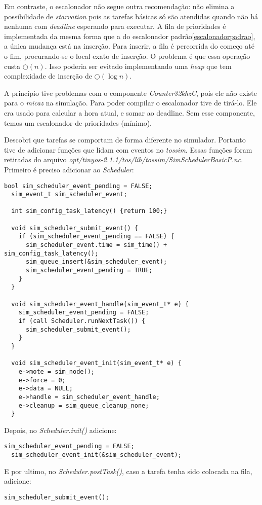 \documentclass[a4paper,onecolumn, 10pt]{article}
\begin{document}
Em contraste, o escalonador não segue outra recomendação: não elimina a possibilidade de \textit{starvation} pois as tarefas
básicas só são atendidas quando não há nenhuma com \textit{deadline} esperando para executar. A fila de prioridades é
implementada da mesma forma que a do escalonador padrão\ref{escalonadorpadrao}, a única mudança está na inserção. Para
inserir, a fila é percorrida do começo até o fim, procurando-se o local exato de inserção. O problema é que essa
operação custa $\bigcirc(n)$. Isso poderia ser evitado implementando uma \textit{heap} que tem complexidade de inserção
de $\bigcirc(\log n)$.

A princípio tive problemas com o componente \textit{Counter32khzC}, 
pois ele não existe para o \textit{micaz} na simulação. Para poder compilar o
escalonador tive de tirá-lo. Ele era usado para calcular a hora atual, e somar ao deadline. Sem esse componente, temos
um escalonador de prioridades (mínimo). 

Descobri que tarefas se comportam de forma diferente no simulador. Portanto tive de adicionar funções que lidam com
eventos no \textit{tossim}. Essas funções foram retiradas do arquivo
\textit{opt/tinyos-2.1.1/tos/lib/tossim/SimSchedulerBasicP.nc}.
Primeiro é preciso adicionar ao \textit{Scheduler}:
\begin{lstlisting}[frame=single]
  bool sim_scheduler_event_pending = FALSE;
  sim_event_t sim_scheduler_event;

  int sim_config_task_latency() {return 100;}
  
  void sim_scheduler_submit_event() {
    if (sim_scheduler_event_pending == FALSE) {
      sim_scheduler_event.time = sim_time() + sim_config_task_latency();
      sim_queue_insert(&sim_scheduler_event);
      sim_scheduler_event_pending = TRUE;
    }
  }

  void sim_scheduler_event_handle(sim_event_t* e) {
    sim_scheduler_event_pending = FALSE;
    if (call Scheduler.runNextTask()) {
      sim_scheduler_submit_event();
    }
  }

  void sim_scheduler_event_init(sim_event_t* e) {
    e->mote = sim_node();
    e->force = 0;
    e->data = NULL;
    e->handle = sim_scheduler_event_handle;
    e->cleanup = sim_queue_cleanup_none;
  }
\end{lstlisting}
Depois, no \textit{Scheduler.init()} adicione:
\begin{lstlisting}[frame=single]
  sim_scheduler_event_pending = FALSE;
  sim_scheduler_event_init(&sim_scheduler_event);
\end{lstlisting}
E por ultimo, no \textit{Scheduler.postTask()}, caso a tarefa tenha sido colocada na fila, adicione:
\begin{lstlisting}[frame=single]
  sim_scheduler_submit_event();
\end{lstlisting}
\end{document}
